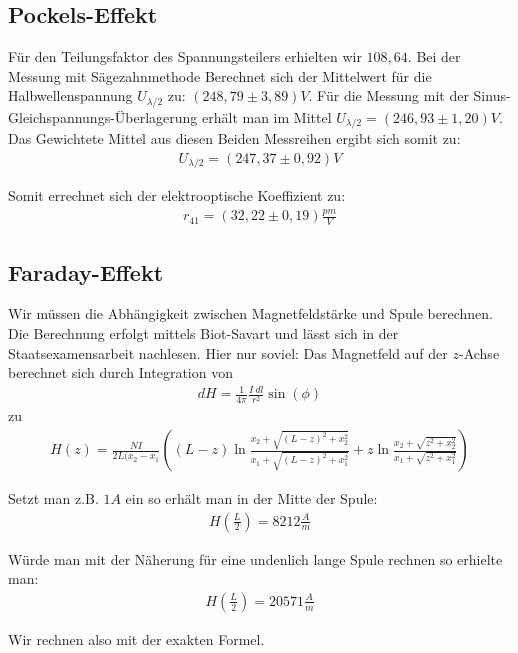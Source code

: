 \documentclass[12pt]{article}
\begin{document}
\subsection{Pockels-Effekt}
Für den Teilungsfaktor des Spannungsteilers erhielten wir $108,64$.
Bei der Messung mit Sägezahnmethode Berechnet sich der Mittelwert für die Halbwellenspannung $U_{\lambda / 2}$ zu: $(248,79 \pm 3,89)V$. Für die Messung mit der Sinus-Gleichspannungs-Überlagerung erhält man im Mittel $U_{\lambda /2} = (246,93 \pm 1,20)V$.\\

Das Gewichtete Mittel aus diesen Beiden Messreihen ergibt sich somit zu: 
\begin{align*}
 U_{\lambda / 2} = (247,37 \pm 0,92)V
\end{align*}

Somit errechnet sich der elektrooptische Koeffizient zu:
\begin{align*}
 r_{41} = (32,22 \pm 0,19) \frac{pm}{V}
\end{align*}


\subsection{Faraday-Effekt}
Wir müssen die Abhängigkeit zwischen Magnetfeldstärke und Spule berechnen. Die Berechnung erfolgt mittels Biot-Savart und lässt sich in der Staatsexamensarbeit nachlesen. Hier nur soviel:
Das Magnetfeld auf der $z$-Achse berechnet sich durch Integration von
\begin{align}
 dH = \frac{1}{4\pi}\frac{I~dl}{r^2} \sin(\phi)
\end{align}
zu
\begin{align}
 H(z) = \frac{NI}{2L(x_2-x_1}\left((L-z)\ln\frac{x_2 + \sqrt{(L-z)^2 + x_2^2}}{x_1 + \sqrt{(L-z)^2 + x_1^2}} + z \ln \frac{x_2 + \sqrt{z^2 + x_2^2}}{x_1 + \sqrt{z^2 + x_1^2}}\right)
\end{align}

Setzt man z.B. $1A$ ein so erhält man in der Mitte der Spule:
\begin{align}
 H\left(\frac{L}{2}\right) = 8212 \frac{A}{m}
\end{align}

Würde man mit der Näherung für eine undenlich lange Spule rechnen so erhielte man:
\begin{align}
 H\left(\frac{L}{2}\right) = 20571 \frac{A}{m}
\end{align}

Wir rechnen also mit der exakten Formel.
\end{document}
